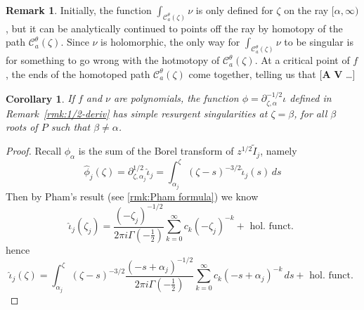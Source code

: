 \documentclass{article}
\newcommand{\series}[1]{\tilde{#1}}
\newcommand{\fracderiv}[3]{\partial^{#1}_{#2, #3}}
\theoremstyle{definition}
\newtheorem{remark}[definition]{Remark}
\theoremstyle{plain}
\newtheorem{corollary}[theorem]{Corollary}
\newenvironment{todo}{\color{Coral}}{\color{black}}
\newenvironment{revised}{\color{DarkBlue}}{\color{black}}
\begin{document}
\begin{remark}
\begin{revised}Initially, the function $\int_{\mathcal{C}^\theta_a(\zeta)} \nu$ is only defined for $\zeta$ on the ray $[\alpha, \infty)$, but it can be analytically continued to points off the ray by homotopy of the path $\mathcal{C}^\theta_a(\zeta)$. Since $\nu$ is holomorphic, the only way for $\int_{\mathcal{C}^\theta_a(\zeta)} \nu$ to be singular is for something to go wrong with the hotmotopy of $\mathcal{C}^\theta_a(\zeta)$. At a critical point of $f$, the ends of the homotoped path $\mathcal{C}^\theta_a(\zeta)$ come together, telling us that \begin{todo}[\textbf{A} \textbf{V} \ldots]\end{todo}\end{revised}
\end{remark}
\begin{todo}
\begin{corollary}\label{simple-res-thimble}
If $f$ and $\nu$ are polynomials, the function ${\phi}=\fracderiv{-1/2}{\zeta}{\alpha}\iota$ defined in Remark~\ref{rmk:1/2-deriv} has simple resurgent singularities at $\zeta=\beta$, for all $\beta$ roots of $P$ such that $\beta\neq\alpha$.  
\end{corollary}
\begin{proof}
Recall ${\phi}_\alpha$ is the sum of the Borel transform of $z^{1/2}\series{I}_j$, namely 
\[\hat{\phi}_j(\zeta)=\fracderiv{1/2}{\zeta}{\alpha_j}\hat{\iota}_j=\int_{\alpha_j}^\zeta(\zeta-s)^{-3/2}\hat{\iota}_j(s)\, ds\]
Then by Pham's result (see \eqref{rmk:Pham formula}) we know 
\[\hat{\iota}_j(\zeta_j)=\frac{(-\zeta_j)^{-1/2}}{2\pi i\Gamma(-\tfrac{1}{2})}\sum_{k=0}^\infty c_k (-\zeta_j)^{-k} + \text{ hol. funct. }\]
hence 
\[\hat{\iota}_j(\zeta)=\int_{\alpha_j}^\zeta(\zeta-s)^{-3/2}\frac{(-s+\alpha_j)^{-1/2}}{2\pi i\Gamma(-\tfrac{1}{2})}\sum_{k=0}^\infty c_k (-s+\alpha_j)^{-k} \, ds + \text{ hol. funct. }\]
\end{proof}
\end{todo}
\end{document}
